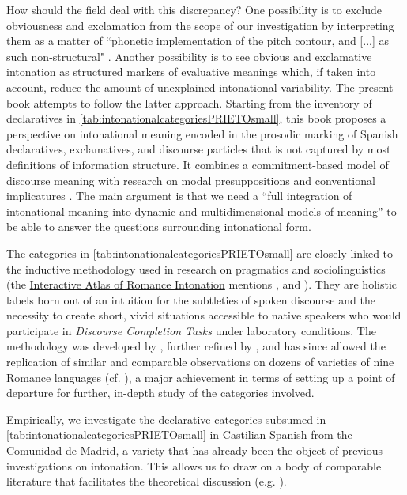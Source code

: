 How should the field deal with this discrepancy? One possibility is to exclude obviousness and exclamation from the scope of our investigation by interpreting them as a matter of ``phonetic implementation of the pitch contour, and [...] as such non-structural" \citep[24]{Gussenhoven2004}. Another possibility is to see obvious and exclamative intonation as structured markers of evaluative meanings which, if taken into account, reduce the amount of unexplained intonational variability. The present book attempts to follow the latter approach. Starting from the inventory of declaratives in \autoref{tab:intonationalcategoriesPRIETOsmall}, this book proposes a perspective on intonational meaning encoded in the prosodic marking of Spanish declaratives, exclamatives, and discourse particles that is not captured by most definitions of information structure. It combines a commitment-based model of discourse meaning \citep{FarkasBruce.2010,Rett.2021emotivemarkers,Rett.2021expressivesandmiratives} with research on modal presuppositions and conventional implicatures \citep{Potts.2007expressivedimension,BianchiBocciCruschina.2016,Reich.2018}. The main argument is that we need a “full integration of intonational meaning into dynamic and multidimensional models of meaning”\citep[371]{Prieto.2015} to be able to answer the questions surrounding intonational form.

The categories in \autoref{tab:intonationalcategoriesPRIETOsmall} are closely linked to the inductive methodology used in research on pragmatics and sociolinguistics (the \href{http://prosodia.upf.edu/iari/methodology.html\#Prieto}{Interactive Atlas of Romance Intonation} mentions \cite{BlumKulka1989}, \cite{Billmyer2000} and \cite{FelixBrasdefer.2010}). They are holistic labels born out of an intuition for the subtleties of spoken discourse and the necessity to create short, vivid situations accessible to native speakers who would participate in \textit{Discourse Completion Tasks} under laboratory conditions. The methodology was developed by \citet{Prieto.2001}, further refined by \citet{Prieto2009-2013}, and has since allowed the replication of similar and comparable observations on dozens of varieties of nine Romance languages (cf. \cite{Prieto2010.2014.Atlas}), a major achievement in terms of setting up a point of departure for further, in-depth study of the categories involved.

Empirically, we investigate the declarative categories subsumed in \autoref{tab:intonationalcategoriesPRIETOsmall} in Castilian Spanish from the Comunidad de Madrid, a variety that has already been the object of previous investigations on intonation. This allows us to draw on a body of comparable literature that facilitates the theoretical discussion (e.g. \cite{EstebasVilaplanaPrieto.2008,EstebasVilaplanaPrieto.2010,ElviraGarcia.2016,TorreiraGrice.2018}).

